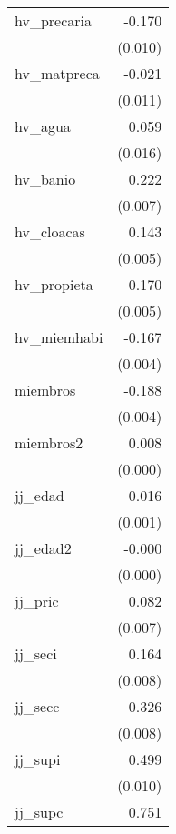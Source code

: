 {\begin{longtable}{l*{1}{D{.}{.}{-1}}}
hv\_precaria &      -0.170\sym{***}\\
            &     (0.010)         \\
\addlinespace
hv\_matpreca &      -0.021         \\
            &     (0.011)         \\
\addlinespace
hv\_agua     &       0.059\sym{***}\\
            &     (0.016)         \\
\addlinespace
hv\_banio    &       0.222\sym{***}\\
            &     (0.007)         \\
\addlinespace
hv\_cloacas  &       0.143\sym{***}\\
            &     (0.005)         \\
\addlinespace
hv\_propieta &       0.170\sym{***}\\
            &     (0.005)         \\
\addlinespace
hv\_miemhabi &      -0.167\sym{***}\\
            &     (0.004)         \\
\addlinespace
miembros    &      -0.188\sym{***}\\
            &     (0.004)         \\
\addlinespace
miembros2   &       0.008\sym{***}\\
            &     (0.000)         \\
\addlinespace
jj\_edad     &       0.016\sym{***}\\
            &     (0.001)         \\
\addlinespace
jj\_edad2    &      -0.000\sym{***}\\
            &     (0.000)         \\
\addlinespace
jj\_pric     &       0.082\sym{***}\\
            &     (0.007)         \\
\addlinespace
jj\_seci     &       0.164\sym{***}\\
            &     (0.008)         \\
\addlinespace
jj\_secc     &       0.326\sym{***}\\
            &     (0.008)         \\
\addlinespace
jj\_supi     &       0.499\sym{***}\\
            &     (0.010)         \\
\addlinespace
jj\_supc     &       0.751\sym{***}\\

\end{longtable}}
